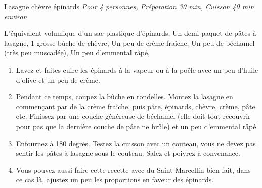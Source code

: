 \begin{recette}{Lasagne chèvre épinards}
  \emph{Pour 4 personnes, Préparation 30 min, Cuisson 40 min environ}
  \begin{ingredients}
    L’équivalent volumique d’un sac plastique d’épinards\sep
    Un demi paquet de pâtes à lasagne\sep
    1 grosse bûche de chèvre\sep
    Un peu de crème fraîche\sep
    Un peu de béchamel (très peu muscadée)\sep
    Un peu d’emmental râpé\sep
  \end{ingredients}

	\begin{enumerate}
	\item Lavez et faites cuire les épinards à la vapeur ou à la poêle avec un peu d’huile d’olive et un peu de crème.
  \item Pendant ce temps, coupez la bûche en rondelles. Montez la lasagne en commençant par de la crème fraîche, puis pâte, épinards, chèvre, crème, pâte etc. Finissez par une couche généreuse de béchamel (elle doit tout recouvrir pour pas que la dernière couche de pâte ne brûle) et un peu d'emmental râpé.
  \item Enfournez à 180 degrés. Testez la cuisson avec un couteau, vous ne devez pas sentir les pâtes à lasagne sous le couteau. Salez et poivrez à convenance. \\
  \item Vous pouvez aussi faire cette recette avec du Saint Marcellin bien fait, dans ce cas là, ajustez un peu les proportions en faveur des épinards.
  \end{enumerate}
\end{recette}
